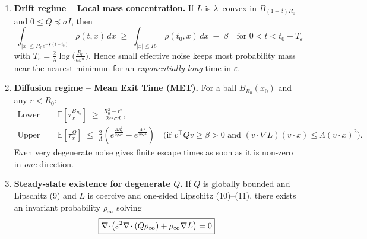 \documentclass[11pt]{article}
\begin{document}
\begin{enumerate}\setlength\itemsep{4pt}
\item \textbf{Drift regime – Local mass concentration.}  
      If $L$ is $\lambda$–convex in $B_{(1+\delta)R_0}$ and $0\le Q\preceq\sigma I$, then\,\cite[Thm.]{}  
      \[
        \boxed{\;
          \int_{\!|x|\le R_0e^{-\frac\lambda2(t-t_0)}}\!\!\rho(t,x)\,dx
          \;\ge\;
          \int_{\!|x|\le R_0}\!\rho(t_0,x)\,dx
          \;-\;\beta
        \quad\text{for }0<t<t_0+T_\varepsilon
        \;}
      \]
      with $T_\varepsilon=\tfrac{2}{\lambda}\log\!\bigl(\tfrac{R_0}{a\varepsilon^{\alpha}}\bigr)$.
      Hence small effective noise keeps most probability mass near the nearest
      minimum for an \emph{exponentially long} time in $\varepsilon$.

\item \textbf{Diffusion regime – Mean Exit Time (MET).}  
      For a ball $B_{R_0}(x_0)$ and any $r<R_0$:
      \begin{align}
        \underline{\text{Lower bound:}}\quad&
        \mathbb E[\tau_{x}^{B_{R_0}}]
        \;\ge\;
        \frac{R_0^{2}-r^{2}}{2\varepsilon^{2}\sigma d},\\
        \underline{\text{Upper bound:}}\quad&
        \mathbb E[\tau_{x}^{\Omega}]
        \;\le\;
        \frac{2}{\Lambda}\!\left(
          e^{\frac{\Lambda R_v^{2}}{2\beta\varepsilon^{2}}}
          -e^{\frac{\Lambda r^{2}}{2\beta\varepsilon^{2}}}
        \right)
        \quad
        \bigl(\text{if }v^{\!\top}Qv\ge\beta>0
               \text{ and }(v\!\cdot\!\nabla L)(v\!\cdot\!x)\le\Lambda(v\!\cdot\!x)^{2}
        \bigr).
      \end{align}
      Even very degenerate noise gives finite escape times as soon as it is non-zero in
      \emph{one} direction.

\item \textbf{Steady-state existence for degenerate $Q$.}  
      If $Q$ is globally bounded and Lipschitz (9) and $L$ is coercive and
      one-sided Lipschitz (10)–(11), there exists an invariant probability
      $\rho_\infty$ solving
      \[
        \boxed{%
          \nabla\!\cdot\!\bigl(
            \varepsilon^{2}\nabla\!\cdot(Q\rho_\infty)
            +\rho_\infty\nabla L
          \bigr)=0
        } 
      \]


\end{enumerate}
\end{document}

